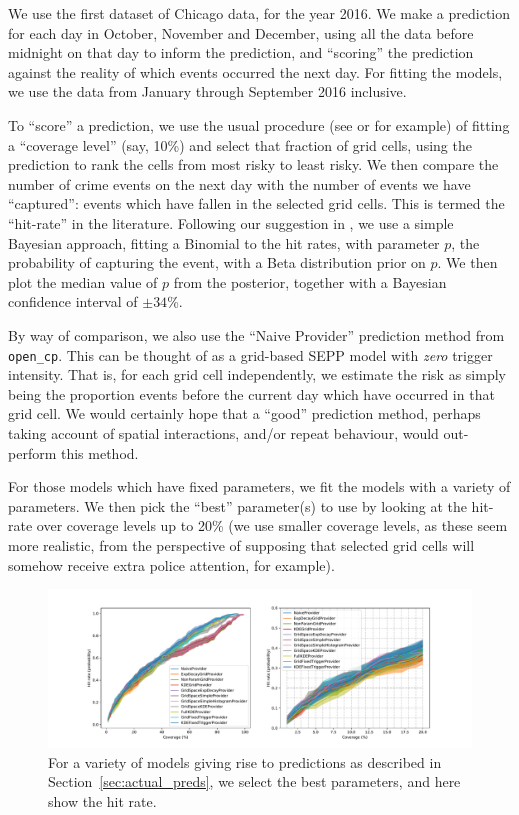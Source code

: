 \documentclass[twoside,a4paper]{article}
\theoremstyle{plain}
\theoremstyle{definition}
\begin{document}
We use the first dataset of Chicago data, for the year 2016.  We make a prediction for each
day in October, November and December, using all the data before midnight on that day to
inform the prediction, and ``scoring'' the prediction against the reality of which events
occurred the next day.  For fitting the models, we use the data from January through
September 2016 inclusive.  

To ``score'' a prediction, we use the usual procedure
(see \cite{arc} or \cite[Section~5]{sepp} for example)
 of fitting a ``coverage level'' (say, 10\%) and select that fraction
of grid cells, using the prediction to rank the cells from most risky to least risky.
We then compare the number of crime events on the next day with the number of events we
have ``captured'': events which have fallen in the selected grid cells.  This is termed the
``hit-rate'' in the literature.  Following our suggestion in \cite{daws2}, we use a simple
Bayesian approach, fitting a Binomial to the hit rates, with parameter $p$, the probability
of capturing the event, with a Beta distribution prior on $p$.  We then plot the median value of
$p$ from the posterior, together with a Bayesian confidence interval of $\pm 34$\%.

By way of comparison, we also use the ``Naive Provider'' prediction method from
\texttt{open\_cp}.  This can be thought of as a grid-based SEPP model with \emph{zero}
trigger intensity.  That is, for each grid cell independently, we estimate the risk as simply
being the proportion events before the current day which have occurred in that grid cell.
We would certainly hope that a ``good'' prediction method, perhaps taking account of spatial
interactions, and/or repeat behaviour, would out-perform this method.

For those models which have fixed parameters, we fit the models with a variety of parameters.  
We then pick the ``best'' parameter(s) to use by looking at the hit-rate over coverage levels
up to 20\% (we use smaller coverage levels, as these seem more realistic, from the perspective
of supposing that selected grid cells will somehow receive extra police attention, for example).

\begin{figure}
  \includegraphics[width=\textwidth]{../notebooks/all_north_preds.pdf}
  \caption{For a variety of models giving rise to predictions as described in
  Section~\ref{sec:actual_preds}, we select the best parameters, and here show the hit rate.}
  \label{fig:north_preds}
\end{figure}
\end{document}
